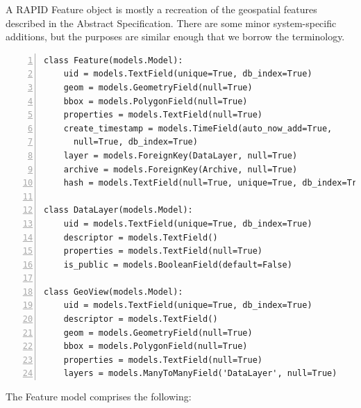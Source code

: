 A RAPID Feature object is mostly a recreation of the geospatial features described in the Abstract Specification. There are some minor system-specific additions, but the purposes are similar enough that we borrow the terminology.

\begin{Verbatim}[samepage=true,baselinestretch=1,numbers=left,xleftmargin=12mm]
class Feature(models.Model):
    uid = models.TextField(unique=True, db_index=True)
    geom = models.GeometryField(null=True)
    bbox = models.PolygonField(null=True)
    properties = models.TextField(null=True)
    create_timestamp = models.TimeField(auto_now_add=True,
      null=True, db_index=True)
    layer = models.ForeignKey(DataLayer, null=True)
    archive = models.ForeignKey(Archive, null=True)
    hash = models.TextField(null=True, unique=True, db_index=True)
    
class DataLayer(models.Model):
    uid = models.TextField(unique=True, db_index=True)
    descriptor = models.TextField()
    properties = models.TextField(null=True)
    is_public = models.BooleanField(default=False)
    
class GeoView(models.Model):
    uid = models.TextField(unique=True, db_index=True)
    descriptor = models.TextField()
    geom = models.GeometryField(null=True)
    bbox = models.PolygonField(null=True)
    properties = models.TextField(null=True)
    layers = models.ManyToManyField('DataLayer', null=True)
\end{Verbatim}

The Feature model comprises the following:

